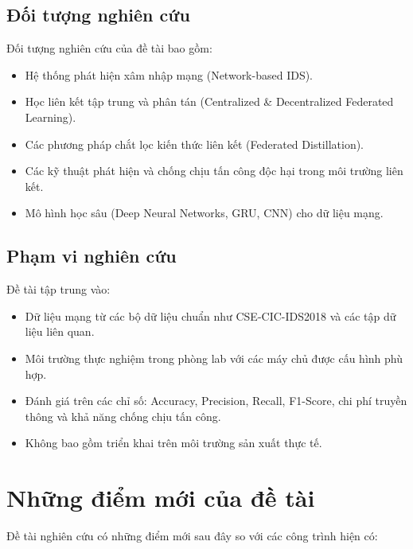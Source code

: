 \subsection{Đối tượng nghiên cứu}
Đối tượng nghiên cứu của đề tài bao gồm:
\begin{itemize}
    \item Hệ thống phát hiện xâm nhập mạng (Network-based IDS).
    \item Học liên kết tập trung và phân tán (Centralized \& Decentralized Federated Learning).
    \item Các phương pháp chắt lọc kiến thức liên kết (Federated Distillation).
    \item Các kỹ thuật phát hiện và chống chịu tấn công độc hại trong môi trường liên kết.
    \item Mô hình học sâu (Deep Neural Networks, GRU, CNN) cho dữ liệu mạng.
\end{itemize}

\subsection{Phạm vi nghiên cứu}
Đề tài tập trung vào:
\begin{itemize}
    \item Dữ liệu mạng từ các bộ dữ liệu chuẩn như CSE-CIC-IDS2018 và các tập dữ liệu liên quan.
    \item Môi trường thực nghiệm trong phòng lab với các máy chủ được cấu hình phù hợp.
    \item Đánh giá trên các chỉ số: Accuracy, Precision, Recall, F1-Score, chi phí truyền thông và khả năng chống chịu tấn công.
    \item Không bao gồm triển khai trên môi trường sản xuất thực tế.
\end{itemize}

\section{Những điểm mới của đề tài}
\label{sec:novelty}

Đề tài nghiên cứu có những điểm mới sau đây so với các công trình hiện có:

